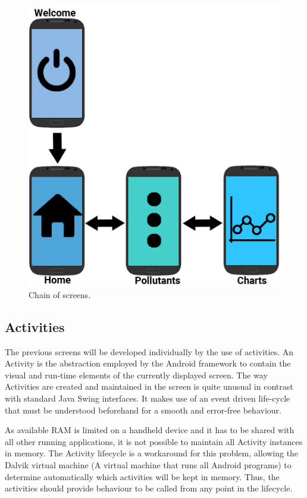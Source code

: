 \begin{figure}[H]
\begin{adjustbox}{width=.45\textwidth,center=\textwidth}
  \centering
  \includegraphics[scale=1]{images/screenChain.png}
\end{adjustbox}
  \caption[Chain of screens]{Chain of screens.}
  \label{fig:chain_of_screens}
\end{figure}

\subsection{Activities}
The previous screens will be developed individually by the use of activities. An Activity is the abstraction employed by the Android framework to contain the visual and run-time elements of the currently displayed screen. The way Activities are created and maintained in the screen is quite unusual in contrast with standard Java Swing interfaces. It makes use of an event driven life-cycle that must be understood beforehand for a smooth and error-free behaviour. 

As available RAM is limited on a handheld device and it has to be shared with all other running applications, it is not possible to maintain all Activity instances in memory. The Activity lifecycle is a workaround for this problem, allowing the Dalvik virtual machine (A virtual machine that runs all Android programs) to determine automatically which activities will be kept in memory. Thus, the activities should provide behaviour to be called from any point in the lifecycle.

